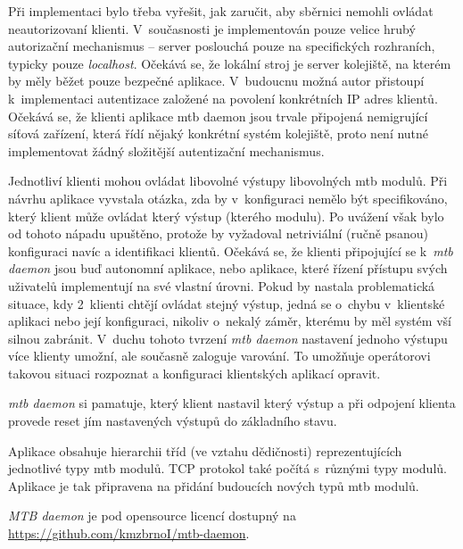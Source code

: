 Při implementaci bylo třeba vyřešit, jak zaručit, aby sběrnici nemohli ovládat
neautorizovaní klienti. V~současnosti je implementován pouze velice hrubý
autorizační mechanismus – server poslouchá pouze na specifických rozhraních,
typicky pouze \textit{localhost}. Očekává se, že lokální stroj je server
kolejiště, na kterém by měly běžet pouze bezpečné aplikace. V~budoucnu možná
autor přistoupí k~implementaci autentizace založené na povolení konkrétních
IP adres klientů. Očekává se, že klienti aplikace \gls{mtb} daemon jsou trvale
připojená nemigrující síťová zařízení, která řídí nějaký konkrétní systém
kolejiště, proto není nutné implementovat žádný složitější autentizační
mechanismus.

Jednotliví klienti mohou ovládat libovolné výstupy libovolných \gls{mtb}
modulů.  Při návrhu aplikace vyvstala otázka, zda by v~konfiguraci nemělo být
specifikováno, který klient může ovládat který výstup (kterého modulu). Po
uvážení však bylo od tohoto nápadu upuštěno, protože by vyžadoval netriviální
(ručně psanou) konfiguraci navíc a identifikaci klientů. Očekává se, že klienti
připojující se k~\textit{\gls{mtb} daemon} jsou buď autonomní aplikace, nebo
aplikace, které řízení přístupu svých uživatelů implementují na své vlastní
úrovni. Pokud by nastala problematická situace, kdy 2~klienti chtějí ovládat
stejný výstup, jedná se o~chybu v~klientské aplikaci nebo její konfiguraci,
nikoliv o~nekalý záměr, kterému by měl systém vší silnou zabránit. V~duchu
tohoto tvrzení \textit{\gls{mtb} daemon} nastavení jednoho výstupu více klienty
umožní, ale současně zaloguje varování. To umožňuje operátorovi takovou
situaci rozpoznat a konfiguraci klientských aplikací opravit.

\textit{\gls{mtb} daemon} si pamatuje, který klient nastavil který výstup a při
odpojení klienta provede reset jím nastavených výstupů do základního stavu.

Aplikace obsahuje hierarchii tříd (ve vztahu dědičnosti) reprezentujících
jednotlivé typy \gls{mtb} modulů. TCP protokol také počítá s~různými typy
modulů. Aplikace je tak připravena na přidání budoucích nových typů \gls{mtb}
modulů.

\textit{MTB daemon} je pod opensource licencí dostupný na
\url{https://github.com/kmzbrnoI/mtb-daemon}.
